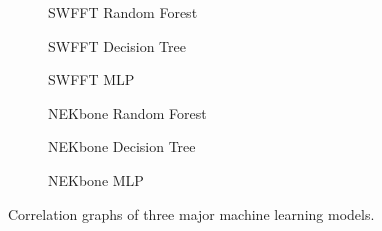 \documentclass[conference, 10pt, onecolumn, draftclsnofoot]{IEEEtran}
\begin{document}
\begin{figure}
    \begin{subfigure}[t]{0.3\textwidth}
         \centering
         
         \caption{SWFFT Random Forest}
         \label{fig:SWFFTRFR}
     \end{subfigure}
     \hfill
     \begin{subfigure}[t]{0.3\textwidth}
         \centering
         
         \caption{SWFFT Decision Tree}
         \label{fig:SWFFTDTR}
     \end{subfigure}
     \hfill
     \begin{subfigure}[t]{0.3\textwidth}
         \centering
         
         \caption{SWFFT MLP}
         \label{fig:SWFFTMLP}
     \end{subfigure}
    \begin{subfigure}[t]{0.3\textwidth}
         \centering
         
         \caption{NEKbone Random Forest}
         \label{fig:nekboneRFR}
     \end{subfigure}
     \hfill
     \begin{subfigure}[t]{0.3\textwidth}
         \centering
         
         \caption{NEKbone Decision Tree}
         \label{fig:nekboneDTR}
     \end{subfigure}
     \hfill
     \begin{subfigure}[t]{0.3\textwidth}
         \centering
         
         \caption{NEKbone MLP}
         \label{fig:nekboneMLP}
     \end{subfigure}
        \caption{Correlation graphs of three major machine learning models.}
        \label{fig:correlation}
\end{figure}
\end{document}
